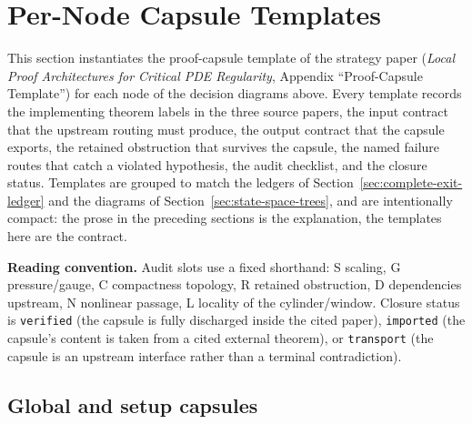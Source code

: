 \documentclass[11pt]{amsart}
\begin{document}
\section{Per-Node Capsule Templates}
\label{sec:capsule-templates}

This section instantiates the proof-capsule template of the strategy paper
(\emph{Local Proof Architectures for Critical PDE Regularity}, Appendix
``Proof-Capsule Template'') for each node of the decision diagrams above.
Every template records the implementing theorem labels in the three source
papers, the input contract that the upstream routing must produce, the output
contract that the capsule exports, the retained obstruction that survives the
capsule, the named failure routes that catch a violated hypothesis, the audit
checklist, and the closure status.  Templates are grouped to match the
ledgers of Section~\ref{sec:complete-exit-ledger} and the diagrams of
Section~\ref{sec:state-space-trees}, and are intentionally compact: the prose in the
preceding sections is the explanation, the templates here are the contract.

\medskip
\noindent\textbf{Reading convention.}  Audit slots use a fixed shorthand:
\textsc{S} scaling, \textsc{G} pressure/gauge, \textsc{C} compactness
topology, \textsc{R} retained obstruction, \textsc{D} dependencies upstream,
\textsc{N} nonlinear passage, \textsc{L} locality of the cylinder/window.
Closure status is \texttt{verified} (the capsule is fully discharged inside
the cited paper), \texttt{imported} (the capsule's content is taken from a
cited external theorem), or \texttt{transport} (the capsule is an upstream
interface rather than a terminal contradiction).

\subsection{Global and setup capsules}
\end{document}
